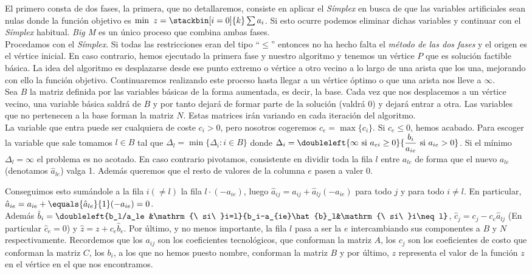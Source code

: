 El primero consta de dos fases, la primera, que no detallaremos, consiste en aplicar el \textit{Símplex} en busca de que las variables artificiales sean nulas donde la función objetivo es $\min\ z=\stackbin[i=0]{k}\sum a_i$. Si esto ocurre podemos eliminar dichas variables y continuar con el \textit{Símplex} habitual. \textit{Big M} es un único proceso que combina ambas fases.\\

Procedamos con el \textit{Símplex}. Si todas las restricciones eran del tipo ``$\leq$'' entonces no ha hecho falta el \textit{método de las dos fases} y el origen es el vértice inicial. En caso contrario, hemos ejecutado la primera fase y nuestro algoritmo y tenemos un vértice $P$ que es solución factible básica. La idea del algoritmo es desplazarse desde ese punto extremo o vértice a otro vecino a lo largo de una arista que los una, mejorando con ello la función objetivo. Continuaremos realizando este proceso hasta llegar a un vértice óptimo o que una arista nos lleve a $\infty$.\\

Sea $B$ la matriz definida por las variables básicas de la forma aumentada, es decir, la base. Cada vez que nos desplacemos a un vértice vecino, una variable básica saldrá de $B$ y por tanto dejará de formar parte de la solución (valdrá 0) y dejará entrar a otra. Las variables que no pertenecen a la base forman la matriz $N$. Estas matrices irán variando en cada iteración del algoritmo.\\

La variable que entra puede ser cualquiera de coste $c_i>0$, pero nosotros cogeremos $c_e=\max\{c_i\}$. Si $c_e\leq 0$, hemos acabado. Para escoger la variable que sale tomamos $l\in B$ tal que $\Delta_l=\min\{\Delta_i:i\in B\}$ donde $\Delta_i=\doubleleft{\infty\mathrm{\ si\ } a_{ei}\geq0}{\dfrac{b_i}{a_{ie}}\mathrm{\ si\ }a_{ie}>0}$. Si el mínimo $\Delta_l=\infty$ el problema es no acotado. En caso contrario pivotamos, consistente en dividir toda la fila $l$ entre $a_{le}$ de forma que el nuevo $a_{le}$ (denotamos $\hat{a}_{le}$) valga 1. Además queremos que el resto de valores de la columna $e$ pasen a valer 0.

Conseguimos esto sumándole a la fila $i(\neq l)$ la fila $l\cdot(-a_{ie})$, luego $\hat{a}_{ij}=a_{ij}+\hat{a}_{lj}(-a_{ie})$ para todo $j$ y para todo $i\neq l$. En particular, $\hat{a}_{ie}=a_{ie}+\equals{\hat{a}_{le}}{1}(-a_{ie})=0$.\\

Además $\hat{b}_i=\doubleleft{b_l/a_le &\mathrm{\ si\ }i=l}{b_i-a_{ie}\hat{b}_l&\mathrm{\ si\ }i\neq l}$, $\hat{c}_j=c_j-c_e\hat{a}_{lj}$ (En particular $\hat{c}_e=0$) y $\hat{z} = z +c_e\hat{b}_e$. Por último, y no menos importante, la fila $l$ pasa a ser la $e$ intercambiando sus componentes a $B$ y $N$ respectivamente. Recordemos que los $a_{ij}$ son los coeficientes tecnológicos, que conforman la matriz $A$, los $c_j$ son los coeficientes de costo que conforman la matriz $C$, los $b_i$, a los que no hemos puesto nombre, conforman la matriz $B$ y por último, $z$ representa el valor de la función $z$ en el vértice en el que nos encontramos.

